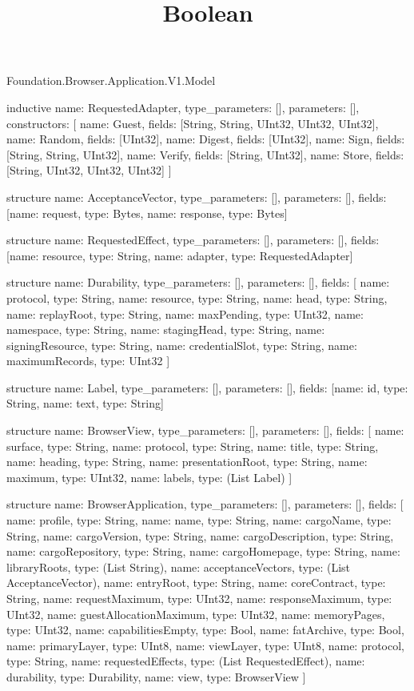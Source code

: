 \begin{lexlean}{Foundation.Browser.Application.V1.Model}
\title{Boolean}
\begin{semanticmodule}
inductive{
  name: RequestedAdapter,
  type_parameters: [],
  parameters: [],
  constructors: [
    {name: Guest, fields: [String, String, UInt32, UInt32, UInt32]},
    {name: Random, fields: [UInt32]},
    {name: Digest, fields: [UInt32]},
    {name: Sign, fields: [String, String, UInt32]},
    {name: Verify, fields: [String, UInt32]},
    {name: Store, fields: [String, UInt32, UInt32, UInt32]}
  ]
}

structure{
  name: AcceptanceVector,
  type_parameters: [],
  parameters: [],
  fields: [{name: request, type: Bytes}, {name: response, type: Bytes}]
}

structure{
  name: RequestedEffect,
  type_parameters: [],
  parameters: [],
  fields: [{name: resource, type: String}, {name: adapter, type: RequestedAdapter}]
}

structure{
  name: Durability,
  type_parameters: [],
  parameters: [],
  fields: [
    {name: protocol, type: String},
    {name: resource, type: String},
    {name: head, type: String},
    {name: replayRoot, type: String},
    {name: maxPending, type: UInt32},
    {name: namespace, type: String},
    {name: stagingHead, type: String},
    {name: signingResource, type: String},
    {name: credentialSlot, type: String},
    {name: maximumRecords, type: UInt32}
  ]
}

structure{
  name: Label,
  type_parameters: [],
  parameters: [],
  fields: [{name: id, type: String}, {name: text, type: String}]
}

structure{
  name: BrowserView,
  type_parameters: [],
  parameters: [],
  fields: [
    {name: surface, type: String},
    {name: protocol, type: String},
    {name: title, type: String},
    {name: heading, type: String},
    {name: presentationRoot, type: String},
    {name: maximum, type: UInt32},
    {name: labels, type: (List Label)}
  ]
}

structure{
  name: BrowserApplication,
  type_parameters: [],
  parameters: [],
  fields: [
    {name: profile, type: String},
    {name: name, type: String},
    {name: cargoName, type: String},
    {name: cargoVersion, type: String},
    {name: cargoDescription, type: String},
    {name: cargoRepository, type: String},
    {name: cargoHomepage, type: String},
    {name: libraryRoots, type: (List String)},
    {name: acceptanceVectors, type: (List AcceptanceVector)},
    {name: entryRoot, type: String},
    {name: coreContract, type: String},
    {name: requestMaximum, type: UInt32},
    {name: responseMaximum, type: UInt32},
    {name: guestAllocationMaximum, type: UInt32},
    {name: memoryPages, type: UInt32},
    {name: capabilitiesEmpty, type: Bool},
    {name: fatArchive, type: Bool},
    {name: primaryLayer, type: UInt8},
    {name: viewLayer, type: UInt8},
    {name: protocol, type: String},
    {name: requestedEffects, type: (List RequestedEffect)},
    {name: durability, type: Durability},
    {name: view, type: BrowserView}
  ]
}
\end{semanticmodule}
\end{lexlean}
